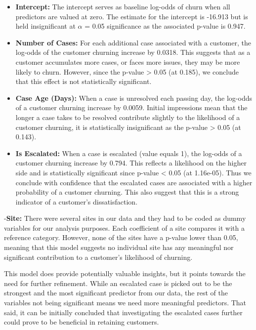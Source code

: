 \documentclass[
]{article}
\begin{document}
\begin{itemize}
\item
  \textbf{Intercept:} The intercept serves as baseline log-odds of churn when all predictors are valued at zero. The estimate for the intercept is -16.913 but is held insignificant at \(\alpha\) = 0.05 significance as the associated p-value is 0.947.
\item
  \textbf{Number of Cases:} For each additional case associated with a customer, the log-odds of the customer churning increase by 0.0318. This suggests that as a customer accumulates more cases, or faces more issues, they may be more likely to churn. However, since the p-value \textgreater{} 0.05 (at 0.185), we conclude that this effect is not statistically significant.
\item
  \textbf{Case Age (Days):} When a case is unresolved each passing day, the log-odds of a customer churning increase by 0.0059. Initial impressions mean that the longer a case takes to be resolved contribute slightly to the likelihood of a customer churning, it is statistically insignificant as the p-value \textgreater{} 0.05 (at 0.143).
\item
  \textbf{Is Escalated:} When a case is escalated (value equals 1), the log-odds of a customer churning increase by 0.794. This reflects a likelihood on the higher side and is statistically significant since p-value \textless{} 0.05 (at 1.16e-05). Thus we conclude with confidence that the escalated cases are associated with a higher probability of a customer churning. This also suggest that this is a strong indicator of a customer's dissatisfaction.
\end{itemize}

-\textbf{Site:} There were several sites in our data and they had to be coded as dummy variables for our analysis purposes. Each coefficient of a site compares it with a reference category. However, none of the sites have a p-value lower than 0.05, meaning that this model suggests no individual site has any meaningful nor significant contribution to a customer's likelihood of churning.

This model does provide potentially valuable insights, but it points towards the need for further refinement. While an escalated case is picked out to be the strongest and the most significant predictor from our data, the rest of the variables not being significant means we need more meaningful predictors. That said, it can be initially concluded that investigating the escalated cases further could prove to be beneficial in retaining customers.
\end{document}
